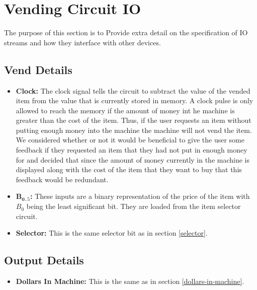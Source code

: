 \section{Vending Circuit IO}
The purpose of this section is to Provide extra detail on the specification of IO streams and how they interface with other devices. 

\subsection{Vend Details}
\begin{itemize}
\item \textbf{Clock:} The clock signal tells the circuit to subtract the value of the vended item from the value that is currently stored in memory. A clock pulse is only allowed to reach the memory if the amount of money int he machine is greater than the cost of the item. Thus, if the user requests an item without putting enough money into the machine the machine will not vend the item. We considered whether or not it would be beneficial to give the user some feedback if they requested an item that they had not put in enough money for and decided that since the amount of money currently in the machine is displayed along with the cost of the item that they want to buy that this feedback would be redundant. 
\item $\mathbf{B_{0..5}}$\textbf{:} These inputs are a binary representation of the price of the item with $B_0$ being the least significant bit. They are loaded from the item selector circuit.
\item \textbf{Selector:} This is the same selector bit as in section \ref{selector}. 
\end{itemize}

\subsection{Output Details}
\begin{itemize}
\item \textbf{Dollars In Machine:} This is the same as in section \ref{dollars-in-machine}.
\end{itemize}
